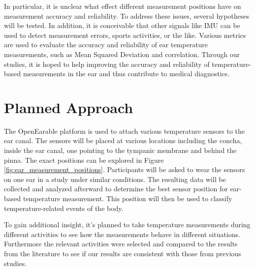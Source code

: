 In particular, it is unclear what effect different measurement positions have on measurement accuracy and reliability.
To address these issues, several hypotheses will be tested. 
In addition, it is conceivable that other signals like IMU can be used to detect measurement errors, sports activities, or the like.
Various metrics are used to evaluate the accuracy and reliability of ear temperature measurements, such as Mean Squared Deviation and correlation.
Through our studies, it is hoped to help improving the accuracy and reliability of temperature-based measurements in the ear and thus contribute to medical diagnostics.

\section{Planned Approach}
\label{ch:Introduction:PlannedApproach}
The OpenEarable platform is used to attach various temperature sensors to the ear canal. 
The sensors will be placed at various locations including the concha, inside the ear canal, one pointing to the tympanic membrane and behind the pinna.
The exact positions can be explored in Figure \ref{fig:ear_measurement_positions}.
Participants will be asked to wear the sensors on one ear in a study under similar conditions.
The resulting data will be collected and analyzed afterward to determine the best sensor position for ear-based temperature measurement. 
This position will then be used to classify temperature-related events of the body.

To gain additional insight, it's planned to take temperature measurements during different activities to see how the measurements behave in different situations. 
Furthermore the relevant activities were selected and compared to the results from the literature to see if our results are consistent with those from previous studies.


